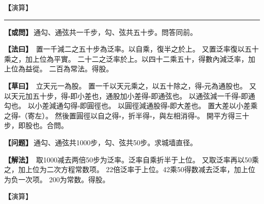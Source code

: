 \documentclass[11pt,a4paper]{article}
\let\origsquare\square
\renewcommand{\square}{\ensuremath{\origsquare}}%
\newcommand{\longline}{\noindent\rule{\textwidth}{0.4pt}}
\newcommand{\clOWEN}[1]{%
  \par\vspace{0.3em}%
  \noindent\textcolor{problemcolor}{\textbf{【或問】}}\,{\tradfont #1}\par\nopagebreak%
}
\newcommand{\mdOWEN}[1]{%
  \par\vspace{0.3em}%
  \noindent\textcolor{problemcolor}{\textbf{【问题】}}\,{\modfont #1}\par\nopagebreak%
}
\newcommand{\clFAYUE}[1]{%
  \par\noindent\textcolor{methodcolor}{\textbf{【法曰】}}\,{\tradfont #1}\par\nopagebreak%
}
\newcommand{\mdFAYUE}[1]{%
  \par\noindent\textcolor{methodcolor}{\textbf{【解法】}}\,{\modfont #1}\par\nopagebreak%
}
\newcommand{\clTSAOYUE}[1]{%
  \par\noindent\textcolor{workcolor}{\textbf{【草曰】}}\,{\tradfont #1}\par%
}
\newcommand{\mdTSAOYUE}[1]{%
  \par\noindent\textcolor{workcolor}{\textbf【演算】}}\,{\modfont #1}\par%
\begin{document}
\begin{paracol}{2}
\begin{rightcolumn}
\mdTSAOYUE{%
辨识得：甲共步即勾、弦之和，225即高股，其中丙斜行即明弦，槐至南门步即明勾。
两已知数之和即极弦内减一个差，相减即差与高股、平勾差之和。
高股减去明股即虚股。
设天元一为明股，即丙出南门直行步。
取50步以天元乘之得$\square$元，应以高股除。
不除，便以此$\square$元为股，内带高股$\square$分母。
再取高股减去天元得$\square$为虚股，以分母高股乘之，得下式$\square$，
加入股得$\square$即半径。
自乘得下式$\square$为半半径冪。内带高股冪为分母（寄左）。
然后取甲共步以分母高股乘之，得$\square$太，加入股得$\square$为勾圆差于上位（内带高股分母）。
又以天元加高股得$\square$为股圆差于下位。
上下相乘得$\square$。又以分母高股乘之，得$\square$，
折半得$\square$为同数，与左式相消得$\square$。
开平方得135步，即明股。符合所问。}
\end{rightcolumn}

\end{paracol}

\vspace{0.3cm}
\begin{center}\longline\end{center}

\begin{paracol}{2}

\begin{leftcolumn}
\clOWEN{通勾、通弦共一千步，勾、弦共五十步。問答同前。}

\clFAYUE{%
置一千減二之五十步為泛率。以自乘，復半之於上。
又置泛率復以五十乘之，加上位為平實。
二十二之泛率於上。以四十二乘五十，得數內減泛率，加上位為益從。
二百為常法。得股。}

\clTSAOYUE{%
立天元一為股。
置一千以天元乘之，以五十除之，得$\square$元為通股也。
又以天元加五十步，得$\square$即小差也，通股加小差得$\square$即通弦也。
以通弦減一千得$\square$即通勾也。
以小差減通勾得$\square$即圓徑也。
以圓徑減通股得$\square$即大差也。
置大差以小差乘之得$\square$（寄左）。
然後置圓徑以自之得$\square$，折半得$\square$，與左相消得$\square$。
開平方得三十步，即股也。合問。}
\end{leftcolumn}

\switchcolumn

\begin{rightcolumn}
\mdOWEN{通勾、通弦共1000步，勾、弦共50步。求城墙直径。}

\mdFAYUE{%
取1000减去两倍50步为泛率。泛率自乘折半于上位。
又取泛率再以50乘之，加上位为二次方程常数项。
22倍泛率于上位。42乘50得数减去泛率，加上位为负一次项。
200为常数。得股。}

\mdTSAOYUE{%
设天元一为股。
取1000以天元乘之，以50除之，得$\square$元为通股。
又以天元加50步得$\square$即小差，通股加小差得$\square$即通弦。
以通弦减1000得$\square$即通勾。
以小差减通勾得$\square$即圆径。
以圆径减通股得$\square$即大差。
取大差以小差乘之得$\square$（寄左）。
然后圆径自乘得$\square$，折半得$\square$，与左式相消得$\square$。
开平方得30步，即股。符合所问。}
\end{rightcolumn}

\end{paracol}
\end{document}
